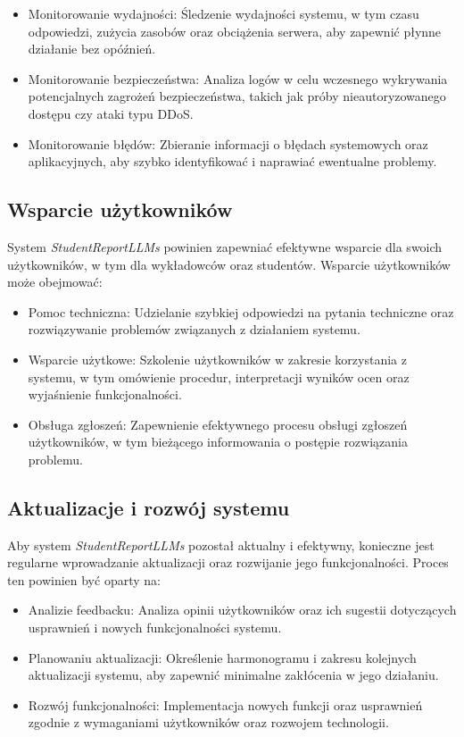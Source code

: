 \documentclass[a4paper, 12pt]{article}
\begin{document}
\begin{itemize}
\item Monitorowanie wydajności: Śledzenie wydajności systemu, w tym czasu odpowiedzi, zużycia zasobów oraz obciążenia serwera, aby zapewnić płynne działanie bez opóźnień.
\item Monitorowanie bezpieczeństwa: Analiza logów w celu wczesnego wykrywania potencjalnych zagrożeń bezpieczeństwa, takich jak próby nieautoryzowanego dostępu czy ataki typu DDoS.
\item Monitorowanie błędów: Zbieranie informacji o błędach systemowych oraz aplikacyjnych, aby szybko identyfikować i naprawiać ewentualne problemy.
\end{itemize}

\subsection{Wsparcie użytkowników}

System \textit{StudentReportLLMs} powinien zapewniać efektywne wsparcie dla swoich użytkowników, w tym dla wykładowców oraz studentów. Wsparcie użytkowników może obejmować:

\begin{itemize}
\item Pomoc techniczna: Udzielanie szybkiej odpowiedzi na pytania techniczne oraz rozwiązywanie problemów związanych z działaniem systemu.
\item Wsparcie użytkowe: Szkolenie użytkowników w zakresie korzystania z systemu, w tym omówienie procedur, interpretacji wyników ocen oraz wyjaśnienie funkcjonalności.
\item Obsługa zgłoszeń: Zapewnienie efektywnego procesu obsługi zgłoszeń użytkowników, w tym bieżącego informowania o postępie rozwiązania problemu.
\end{itemize}

\subsection{Aktualizacje i rozwój systemu}

Aby system \textit{StudentReportLLMs} pozostał aktualny i efektywny, konieczne jest regularne wprowadzanie aktualizacji oraz rozwijanie jego funkcjonalności. Proces ten powinien być oparty na:

\begin{itemize}
\item Analizie feedbacku: Analiza opinii użytkowników oraz ich sugestii dotyczących usprawnień i nowych funkcjonalności systemu.
\item Planowaniu aktualizacji: Określenie harmonogramu i zakresu kolejnych aktualizacji systemu, aby zapewnić minimalne zakłócenia w jego działaniu.
\item Rozwój funkcjonalności: Implementacja nowych funkcji oraz usprawnień zgodnie z wymaganiami użytkowników oraz rozwojem technologii.
\end{itemize}
\end{document}
